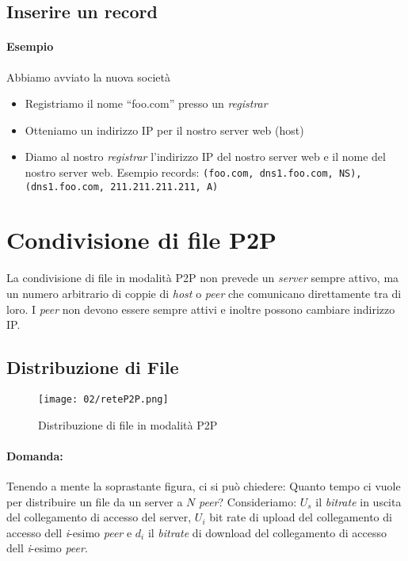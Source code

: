     \subsection{Inserire un record}
        \paragraph{Esempio} Abbiamo avviato la nuova società
        \begin{itemize}
            \item Registriamo il nome ``foo.com'' presso un \textit{registrar}
            \item Otteniamo un indirizzo \Acrshort*{IP} per il nostro server web (host)
            \item Diamo al nostro \textit{registrar} l'indirizzo \Acrshort*{IP} del nostro server web e il nome del nostro server web. Esempio records: \texttt{(foo.com, dns1.foo.com, NS), (dns1.foo.com, 211.211.211.211, A)}
        \end{itemize}
\section[Condivisione di file \texttt{P2P}]{Condivisione di file \Acrshort*{P2P}}
    La condivisione di file in modalità \Acrshort*{P2P} non prevede un \textit{server} sempre attivo, ma un numero arbitrario di coppie di \textit{host} o \textit{peer} che comunicano direttamente tra di loro. I \textit{peer} non devono essere sempre attivi e inoltre possono cambiare indirizzo \Acrshort*{IP}.
    \subsection{Distribuzione di File}
        \begin{figure}[H]
            \centering
            \texttt{[image: 02/reteP2P.png]}
            \caption{Distribuzione di file in modalità \Acrshort*{P2P}}
        \end{figure}
        \paragraph{Domanda:} Tenendo a mente la soprastante figura, ci si può chiedere: Quanto tempo ci vuole per distribuire un file da un server a $ N $ \textit{peer}?\newline
        Consideriamo: \textbf{$U_s$} il \textit{bitrate} in uscita del collegamento di accesso del server, \textbf{$U_i$} bit rate di upload del collegamento di accesso dell \textit{i}-esimo \textit{peer} e \textit{$d_i$} il \textit{bitrate} di download del collegamento di accesso dell \textit{i}-esimo \textit{peer}.
